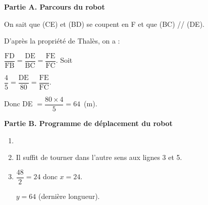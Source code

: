 
\medskip

\textbf{Partie A. Parcours du robot}

\medskip

On sait que (CE) et (BD) se coupent en F et que (BC) // (DE).

D'après la propriété de Thalès, on a :

$\dfrac{\text{FD}}{\text{FB}} = \dfrac{\text{DE}}{\text{BC}} = \dfrac{\text{FE}}{\text{FC}}$. Soit 

$\dfrac{4}{5} = \dfrac{\text{DE}}{80} = \dfrac{\text{FE}}{\text{FC}}$.

Donc DE $= \dfrac{80 \times 4}{5}= 64$~(m).

\bigskip

\textbf{Partie B. Programme de déplacement du robot}

\medskip

\begin{enumerate}
\item ~
\begin{center}
\begin{scratch}
\end{scratch}
\end{center}

\item Il suffit de tourner dans l'autre sens aux lignes 3 et 5.
\item $\dfrac{48}{2} = 24$ donc $x = 24$.

$y = 64$ (dernière longueur).
\end{enumerate}
